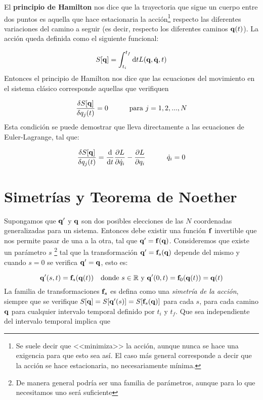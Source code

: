 El \textbf{principio de Hamilton} nos dice que la trayectoria que sigue un cuerpo entre dos puntos es aquella que hace estacionaria la acción\footnote{Se suele decir que <<minimiza>> la acción, aunque nunca se hace una exigencia para que esto sea así. El caso más general corresponde a decir que la acción se hace estacionaria, no necesariamente mínima.} respecto las diferentes variaciones del camino a seguir (es decir, respecto los diferentes caminos $\mathbf{q}(t)$). La acción queda definida como el siguiente funcional:

\begin{equation}
	S[\mathbf{q}] = \int_{t_i}^{t_f} \mathrm{d} t L(\mathbf{q},\dot{\mathbf{q}},t)
\end{equation} 
Entonces el principio de Hamilton nos dice que las ecuaciones del movimiento en el sistema clásico corresponde aquellas que verifiquen 

\begin{equation}
	\frac{\delta S[\mathbf{q}]}{\delta q_j (t)} =  0 \quad \quad \quad \text{para} \ j=1,2,...,N
\end{equation}
Esta condición se puede demostrar que lleva directamente a las ecuaciones de Euler-Lagrange, tal que: 

\begin{equation}
	\frac{\delta S[\mathbf{q}]}{\delta q_j (t)} = \frac{\mathrm{d} }{\mathrm{d} t} \frac{\partial L}{\partial \dot{q}_i} - \frac{\partial L}{\partial q_i} \quad \quad \quad \dot{q}_i = 0 
\end{equation}


\section{Simetrías y Teorema de Noether} \label{Sec:01-02}

Supongamos que $\mathbf{q}'$ y $\mathbf{q}$ son dos posibles elecciones de las $N$ coordenadas generalizadas para un sistema. Entonces debe existir una función $\mathbf{f}$ invertible que nos permite pasar de una a la otra, tal que $\mathbf{q}'=\mathbf{f}(\mathbf{q})$. Consideremos que existe un  parámetro $s$  \footnote{De manera general podría ser una familia de parámetros, aunque para lo que necesitamos uno será suficiente} tal que la transformación $\mathbf{q}'=\mathbf{f}_s(\mathbf{q})$ depende del mismo y cuando $s=0$ se verifica $\mathbf{q}'=\mathbf{q}$, esto es:

\begin{equation}
	\mathbf{q}' (s,t) = \mathbf{f}_s (\mathbf{q} (t)) \quad \text{donde} \ s \in \mathbb{R} \ \text{y} \ \mathbf{q}'(0,t) = \mathbf{f}_0 (\mathbf{q}(t)) = \mathbf{q}(t)
\end{equation}
La familia de transformaciones $\mathbf{f}_s$ es defina como una \textit{simetría de la acción},
siempre que se verifique $S[\mathbf{q}] = S[\mathbf{q}'(s)] = S[\mathbf{f}_s(\mathbf{q})]$ para cada $s$, para cada camino $\mathbf{q}$ para cualquier intervalo temporal definido por $t_i$ y $t_f$. Que sea independiente del intervalo temporal implica que

